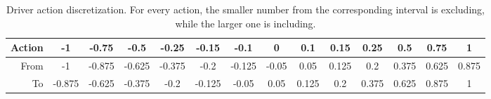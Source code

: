 \begin{table}[htbp]
\footnotesize
\centering
\centerfloat
\setlength{\tabcolsep}{3pt}
\begin{tabular}{@{}rccccccccccccc@{}}
\toprule
Action & -1     & -0.75  & -0.5   & -0.25  & -0.15  & -0.1   & 0     & 0.1   & 0.15  & 0.25  & 0.5   & 0.75  & 1 \\ \midrule
From   & -1   & -0.875 & -0.625 & -0.375 & -0.2   & -0.125 & -0.05 & 0.05  & 0.125 & 0.2   & 0.375 & 0.625 & 0.875 \\ 
To     & -0.875 & -0.625 & -0.375 & -0.2   & -0.125 & -0.05  & 0.05  & 0.125 & 0.2   & 0.375 & 0.625 & 0.875 & 1  \\ \bottomrule
\end{tabular}
\caption[Driver action discretization]{Driver action discretization. For every action, the smaller number from the corresponding interval is excluding, while the larger one is including.}
\label{tab:action_dist}
\end{table} 